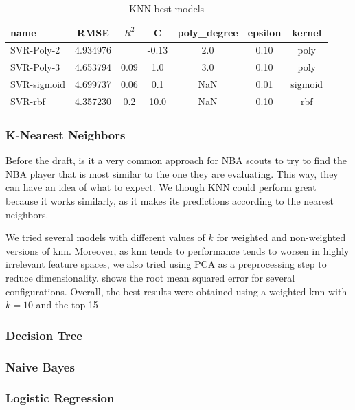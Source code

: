 \begin{table}[H]
    \centering
    \begin{tabular}{lcccccc}
    \toprule
    name & RMSE & $R^2$ & C &  poly\_degree &  epsilon & kernel \\
    \midrule
    SVR-Poly-2 & 4.934976 & & -0.13 & 2.0 &  0.10 & poly \\
    SVR-Poly-3 & 4.653794 & 0.09 & 1.0 & 3.0 & 0.10 & poly \\
    SVR-sigmoid & 4.699737 & 0.06 & 0.1 & NaN & 0.01 & sigmoid \\
    SVR-rbf & 4.357230 & 0.2 & 10.0 & NaN & 0.10 &  rbf \\
    \bottomrule
    \end{tabular}
    \caption{KNN best models}
    \label{ml:knn}
\end{table}

\subsubsection{K-Nearest Neighbors}%
\label{ssub:k-nearest-neighbors}

Before the draft, is it a very common approach for NBA scouts to try to find the NBA player that is most similar to the one they are evaluating. This way, they can have an idea of what to expect. We though KNN could perform great because it works similarly, as it makes its predictions according to the nearest neighbors.

We tried several models with different values of $k$ for weighted and non-weighted versions of knn. Moreover, as knn tends to performance tends to worsen in highly irrelevant feature spaces, we also tried using PCA as a preprocessing step to reduce dimensionality. shows the root mean squared error for several configurations. Overall, the best results were obtained using a weighted-knn with $k=10$ and the top 15 





\subsubsection{Decision Tree}%
\label{ssub:decision-tree}

\subsubsection{Naive Bayes}%
\label{ssub:naive-bayes}

\subsubsection{Logistic Regression}%
\label{ssub:logistic-regression}

